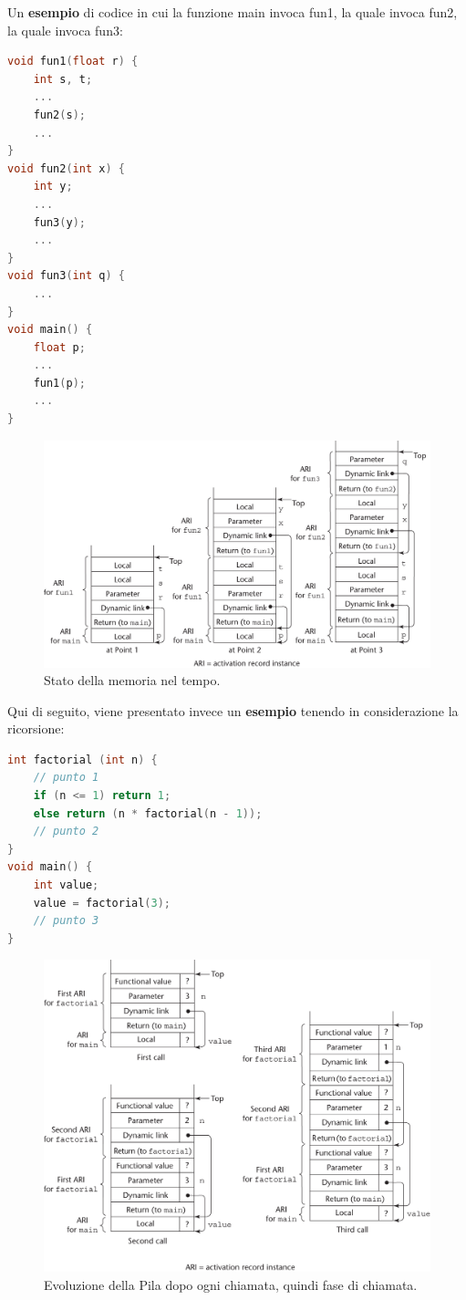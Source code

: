 \documentclass[a4paper]{article}
\begin{document}
 	\noindent
 	Un \textcolor{Green4}{\textbf{esempio}} di codice in cui la funzione \textsf{main} invoca \textsf{fun1}, la quale invoca \textsf{fun2}, la quale invoca \textsf{fun3}:
	\begin{lstlisting}[language=C]
void fun1(float r) {
	int s, t;
	...
	fun2(s);
	...
}
void fun2(int x) {
	int y;
	...
	fun3(y);
	...
}
void fun3(int q) {
	...
}
void main() {
	float p;
	...
	fun1(p);
	...
}\end{lstlisting}
	\begin{figure}[!htp]
		\centering
		\includegraphics[width=\textwidth]{img/eg-allocazione_memoria.png}
		\caption{Stato della memoria nel tempo.}
	\end{figure}\newpage
	
	\noindent
	Qui di seguito, viene presentato invece un \textcolor{Green4}{\textbf{esempio}} tenendo in considerazione la ricorsione:
	\begin{lstlisting}[language=C]
int factorial (int n) {
	// punto 1
	if (n <= 1) return 1;
	else return (n * factorial(n - 1));
	// punto 2
}
void main() {
	int value;
	value = factorial(3);
	// punto 3
}\end{lstlisting}
	\begin{figure}[!htp]
		\centering
		\includegraphics[width=\textwidth]{img/eg-allocazione_memoria-1.png}
		\caption{Evoluzione della Pila dopo ogni chiamata, quindi fase di chiamata.}
	\end{figure}\newpage
	
\end{document}
